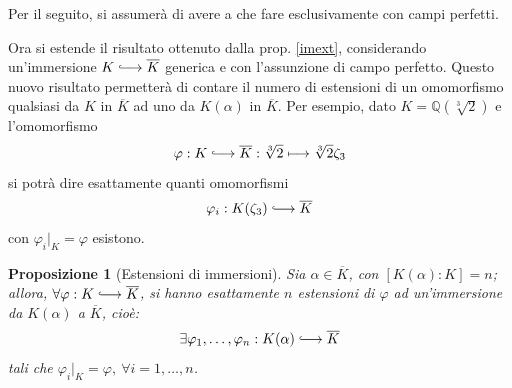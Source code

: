 \documentclass[12pt]{scrartcl}
\theoremstyle{style}
\newtheorem{prop}{Proposizione}[section]
\newenvironment{boxenv}[1][]{
    \begin{eqbox}[#1]
    }{
   \end{eqbox}
}
\numberwithin{equation}{subsection}
\newcommand{\longhookrightarrow}{\lhook\joinrel\longrightarrow}
\begin{document}
\begin{boxenv}[]
Per il seguito, si assumer\`a di avere a che fare esclusivamente con campi perfetti.
\end{boxenv}
\noindent Ora si estende il risultato ottenuto dalla prop. \ref{imext}, considerando un'immersione $K \longhookrightarrow \overline{K}$ generica e con l'assunzione di campo perfetto.
Questo nuovo risultato permetter\`a di contare il numero di estensioni di un omomorfismo qualsiasi da $K$ in $\overline{K}$ ad uno da $K(\alpha )$ in $\overline{K}$.
Per esempio, dato $K = \mathbb{Q}(\sqrt[3]{2}) $ e l'omomorfismo 
\[
	\varphi :K\longhookrightarrow \overline{K} : \sqrt[3]{2} \longmapsto \sqrt[3]{2} \zeta_3
\] 
si potr\`a dire esattamente quanti omomorfismi 
\[
\varphi _i : K(\zeta_3) \longhookrightarrow \overline{K}
\] 
con $\varphi_i |_K = \varphi $ esistono.
\begin{prop}
	[Estensioni di immersioni]
\label{imext2}
	Sia $\alpha  \in \overline{K}$, con $[K(\alpha ) : K] = n$; allora, $\forall \varphi : K \longhookrightarrow \overline{K}$, si hanno esattamente $n$ estensioni di $\varphi $ ad un'immersione da $K(\alpha )$ a $\overline{K}$, cio\`e:
	\[
	\exists \varphi _1,\ldots,\varphi _n : K(\alpha ) \longhookrightarrow  \overline{K}
	\] 
	tali che $\varphi _i|_K = \varphi ,\ \forall i = 1,\ldots,n$.
\end{prop}
\end{document}
